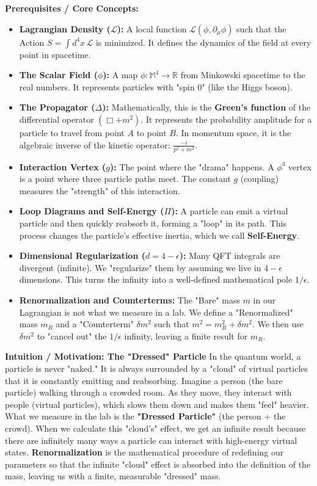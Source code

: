 \begin{solution}
\textbf{Prerequisites / Core Concepts:}
\begin{itemize}
    \item \textbf{Lagrangian Density ($\mathcal{L}$):} A local function $\mathcal{L}(\phi, \partial_\mu \phi)$ such that the Action $S = \int d^4x \, \mathcal{L}$ is minimized. It defines the dynamics of the field at every point in spacetime.
    \item \textbf{The Scalar Field ($\phi$):} A map $\phi: \mathbb{M}^4 \to \mathbb{R}$ from Minkowski spacetime to the real numbers. It represents particles with "spin 0" (like the Higgs boson).
    \item \textbf{The Propagator ($\Delta$):} Mathematically, this is the \textbf{Green's function} of the differential operator $(\Box + m^2)$. It represents the probability amplitude for a particle to travel from point $A$ to point $B$. In momentum space, it is the algebraic inverse of the kinetic operator: $\frac{-i}{p^2+m^2}$.
    \item \textbf{Interaction Vertex ($g$):} The point where the "drama" happens. A $\phi^3$ vertex is a point where three particle paths meet. The constant $g$ (coupling) measures the "strength" of this interaction.
    \item \textbf{Loop Diagrams and Self-Energy ($\Pi$):} A particle can emit a virtual particle and then quickly reabsorb it, forming a "loop" in its path. This process changes the particle's effective inertia, which we call \textbf{Self-Energy}.
    \item \textbf{Dimensional Regularization ($d = 4-\epsilon$):} Many QFT integrals are divergent (infinite). We "regularize" them by assuming we live in $4-\epsilon$ dimensions. This turns the infinity into a well-defined mathematical pole $1/\epsilon$.
    \item \textbf{Renormalization and Counterterms:} The "Bare" mass $m$ in our Lagrangian is not what we measure in a lab. We define a "Renormalized" mass $m_R$ and a "Counterterm" $\delta m^2$ such that $m^2 = m_R^2 + \delta m^2$. We then use $\delta m^2$ to "cancel out" the $1/\epsilon$ infinity, leaving a finite result for $m_R$.
\end{itemize}

\textbf{Intuition / Motivation: The "Dressed" Particle}
In the quantum world, a particle is never "naked." It is always surrounded by a "cloud" of virtual particles that it is constantly emitting and reabsorbing. 
Imagine a person (the bare particle) walking through a crowded room. As they move, they interact with people (virtual particles), which slows them down and makes them "feel" heavier. What we measure in the lab is the \textbf{"Dressed Particle"} (the person + the crowd). 
When we calculate this "cloud's" effect, we get an infinite result because there are infinitely many ways a particle can interact with high-energy virtual states. \textbf{Renormalization} is the mathematical procedure of redefining our parameters so that the infinite "cloud" effect is absorbed into the definition of the mass, leaving us with a finite, measurable "dressed" mass.


\end{solution}
